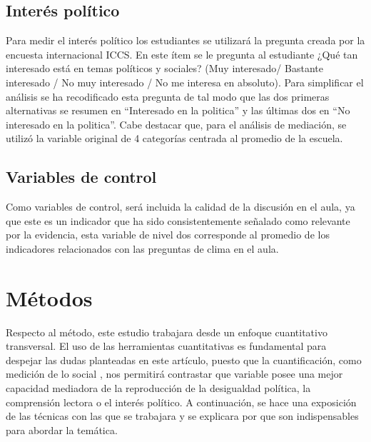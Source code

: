 \documentclass[12pt,twoside]{templates/facsothesis}
\begin{document}
\hypertarget{interuxe9s-poluxedtico}{%
\subsection{Interés político}\label{interuxe9s-poluxedtico}}

Para medir el interés político los estudiantes se utilizará la pregunta creada por la encuesta internacional ICCS. En este ítem se le pregunta al estudiante ¿Qué tan interesado está en temas políticos y sociales? (Muy interesado/ Bastante interesado / No muy interesado / No me interesa en absoluto). Para simplificar el análisis se ha recodificado esta pregunta de tal modo que las dos primeras alternativas se resumen en ``Interesado en la politica'' y las últimas dos en ``No interesado en la politica''. Cabe destacar que, para el análisis de mediación, se utilizó la variable original de 4 categorías centrada al promedio de la escuela.

\hypertarget{variables-de-control}{%
\subsection{Variables de control}\label{variables-de-control}}

Como variables de control, será incluida la calidad de la discusión en el aula, ya que este es un indicador que ha sido consistentemente señalado como relevante por la evidencia, esta variable de nivel dos corresponde al promedio de los indicadores relacionados con las preguntas de clima en el aula.

\hypertarget{muxe9todos}{%
\section{Métodos}\label{muxe9todos}}

Respecto al método, este estudio trabajara desde un enfoque cuantitativo transversal. El uso de las herramientas cuantitativas es fundamental para despejar las dudas planteadas en este artículo, puesto que la cuantificación, como medición de lo social \citep{canales_METODOLOGIAS_2006}, nos permitirá contrastar que variable posee una mejor capacidad mediadora de la reproducción de la desigualdad política, la comprensión lectora o el interés político. A continuación, se hace una exposición de las técnicas con las que se trabajara y se explicara por que son indispensables para abordar la temática.
\end{document}

